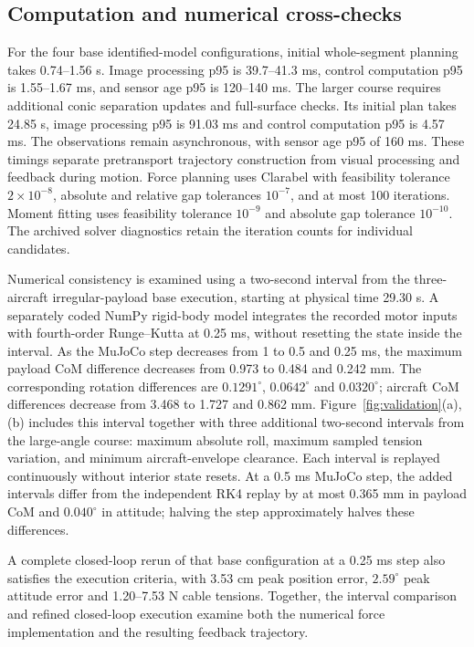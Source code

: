 \subsection{Computation and numerical cross-checks}
For the four base identified-model configurations, initial whole-segment planning takes 0.74--1.56 s. Image processing p95 is 39.7--41.3 ms, control computation p95 is 1.55--1.67 ms, and sensor age p95 is 120--140 ms. The larger course requires additional conic separation updates and full-surface checks. Its initial plan takes 24.85 s, image processing p95 is 91.03 ms and control computation p95 is 4.57 ms. The observations remain asynchronous, with sensor age p95 of 160 ms. These timings separate pretransport trajectory construction from visual processing and feedback during motion. Force planning uses Clarabel with feasibility tolerance $2\times10^{-8}$, absolute and relative gap tolerances $10^{-7}$, and at most 100 iterations. Moment fitting uses feasibility tolerance $10^{-9}$ and absolute gap tolerance $10^{-10}$. The archived solver diagnostics retain the iteration counts for individual candidates.

Numerical consistency is examined using a two-second interval from the three-aircraft irregular-payload base execution, starting at physical time 29.30 s. A separately coded NumPy rigid-body model integrates the recorded motor inputs with fourth-order Runge--Kutta at 0.25 ms, without resetting the state inside the interval. As the MuJoCo step decreases from 1 to 0.5 and 0.25 ms, the maximum payload CoM difference decreases from 0.973 to 0.484 and 0.242 mm. The corresponding rotation differences are $0.1291^\circ$, $0.0642^\circ$ and $0.0320^\circ$; aircraft CoM differences decrease from 3.468 to 1.727 and 0.862 mm. Figure~\ref{fig:validation}(a),(b) includes this interval together with three additional two-second intervals from the large-angle course: maximum absolute roll, maximum sampled tension variation, and minimum aircraft-envelope clearance. Each interval is replayed continuously without interior state resets. At a 0.5 ms MuJoCo step, the added intervals differ from the independent RK4 replay by at most 0.365 mm in payload CoM and $0.040^\circ$ in attitude; halving the step approximately halves these differences.

A complete closed-loop rerun of that base configuration at a 0.25 ms step also satisfies the execution criteria, with 3.53 cm peak position error, $2.59^\circ$ peak attitude error and 1.20--7.53 N cable tensions. Together, the interval comparison and refined closed-loop execution examine both the numerical force implementation and the resulting feedback trajectory.



